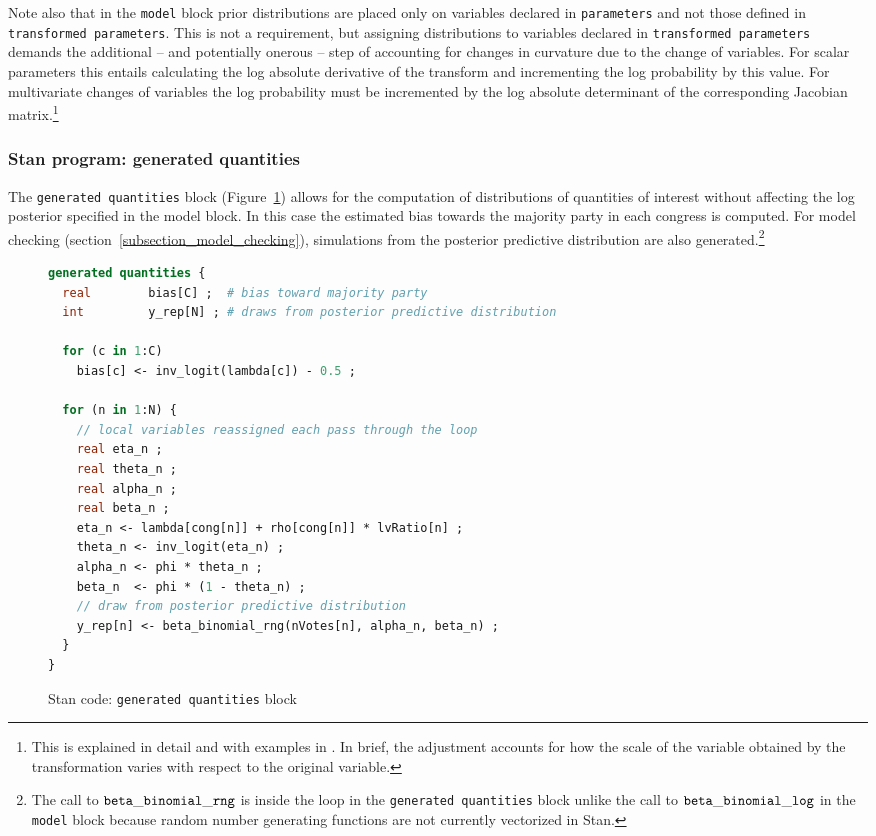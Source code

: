Note also that in the {\tt model} block prior distributions are placed only on variables declared 
in {\tt parameters}  and not those defined in {\tt transformed parameters}. This is not a requirement, 
but assigning distributions to variables declared in {\tt transformed parameters} demands the 
additional -- and potentially onerous -- step of accounting for changes in curvature due to the 
change of variables. For scalar parameters this entails calculating the log absolute derivative of 
the transform and incrementing the log probability by this value. For multivariate changes of variables 
the log probability must be incremented by the log absolute determinant of the corresponding 
Jacobian matrix.\footnote{This is explained in detail and with examples in 
. In brief, the adjustment accounts for how 
the scale of the variable obtained by the transformation varies with respect to the 
original variable.}



\subsubsection{Stan program: generated quantities}

The {\tt generated quantities} block (Figure~\ref{stan_generated_quantities}) allows for the computation 
of distributions of quantities of interest without affecting the log posterior specified in the model block. 
In this case the estimated bias towards the majority party in each congress is computed. For model 
checking (section~\ref{subsection_model_checking}), simulations from the posterior predictive distribution 
are also generated.\footnote{The call to ${\tt beta\_binomial\_rng}$ is inside the loop in the 
{\tt generated quantities} block unlike the call to ${\tt beta\_binomial\_log}$ in the {\tt model} block because 
random number generating functions are not currently vectorized in Stan.} 


\begin{figure}[h]
\begin{lstlisting}[language=Stan, frame=trBL]
generated quantities {
  real        bias[C] ;  # bias toward majority party
  int         y_rep[N] ; # draws from posterior predictive distribution
  
  for (c in 1:C) 
    bias[c] <- inv_logit(lambda[c]) - 0.5 ;
  
  for (n in 1:N) {
    // local variables reassigned each pass through the loop
    real eta_n ;
    real theta_n ;
    real alpha_n ;
    real beta_n ;
    eta_n <- lambda[cong[n]] + rho[cong[n]] * lvRatio[n] ;
    theta_n <- inv_logit(eta_n) ;    
    alpha_n <- phi * theta_n ;
    beta_n  <- phi * (1 - theta_n) ;
    // draw from posterior predictive distribution
    y_rep[n] <- beta_binomial_rng(nVotes[n], alpha_n, beta_n) ;
  }
}
\end{lstlisting}
\caption{Stan code: {\tt generated quantities} block}
\label{stan_generated_quantities}
\end{figure}

\clearpage


